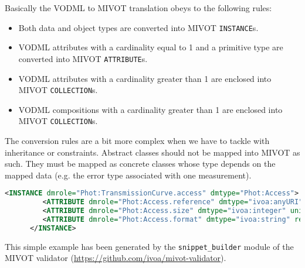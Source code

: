 Basically the VODML to MIVOT translation obeys to the following rules:
\begin{itemize}
    \item Both data and object types are converted into MIVOT \texttt{INSTANCE}s. 
    \item VODML attributes with a cardinality equal to 1 and a primitive type 
          are converted into MIVOT \texttt{ATTRIBUTE}s. 
    \item VODML attributes with a cardinality greater than 1 are enclosed into MIVOT \texttt{COLLECTION}s. 
    \item VODML compositions with a cardinality greater than 1 are enclosed into MIVOT \texttt{COLLECTION}s.     
\end{itemize} 

The conversion rules are a bit more complex when we have to tackle with inheritance or constraints.
Abstract classes should not be mapped into MIVOT as such. They must be mapped as concrete classes 
whose type depends on the mapped data (e.g. the error type associated with one measurement).

\begin{lstlisting}[caption={MIVOT instanciation of the PhotDM class \texttt{Access}. 
VODML attributes are mapped as simple \texttt{ATTRIBUTE}s since their cardinality is equal to 
1 and they have primitive types. In this example, automatically 
generated, \texttt{ATTRIBUTE} come with both \texttt{ref} and \texttt{value}. Using one, the other or both 
depends on the actual data being annotated (see \ref{ATTRIBUTE}). 
The cryptic  "@@@@@" labels are due to a trick of the annoter tool. They must be replaced with the 
 actual \texttt{FIELD} names for attributes that are set with from field values.
},language=XML]
      <INSTANCE dmrole="Phot:TransmissionCurve.access" dmtype="Phot:Access">
         <ATTRIBUTE dmrole="Phot:Access.reference" dmtype="ivoa:anyURI" ref="@@@@@" value=""/>
         <ATTRIBUTE dmrole="Phot:Access.size" dmtype="ivoa:integer" unit="" ref="@@@@@" value=""/>
         <ATTRIBUTE dmrole="Phot:Access.format" dmtype="ivoa:string" ref="@@@@@" value=""/>
      </INSTANCE>
\end{lstlisting}  

This simple example has been generated by the \texttt{snippet\_builder} module of the MIVOT validator 
(\url{https://github.com/ivoa/mivot-validator}).


